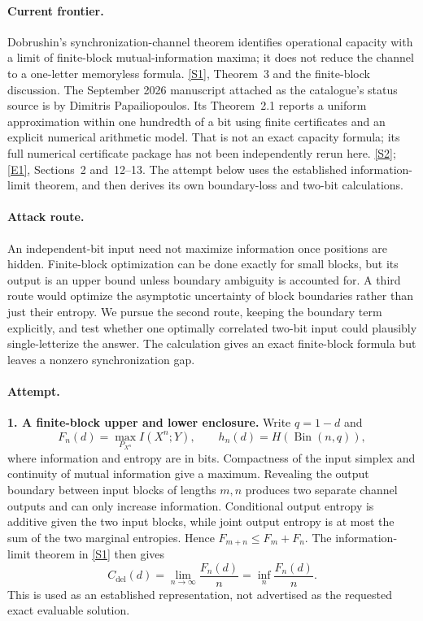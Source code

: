 \documentclass[11pt,a4paper]{article}
\newcommand{\sref}[2]{\hyperlink{source:#1:#2}{[S#2]}}
\newcommand{\eref}[2]{\hyperlink{extra:#1:#2}{[E#2]}}
\numberwithin{equation}{section}
\begin{document}
\paragraph{Current frontier.}
Dobrushin's synchronization-channel theorem identifies operational
capacity with a limit of finite-block mutual-information maxima; it
does not reduce the channel to a one-letter memoryless formula.
\sref{30006798}{1}, Theorem~3 and the finite-block discussion.
The September 2026 manuscript attached as the catalogue's status source
is by Dimitris Papailiopoulos. Its Theorem~2.1 reports a uniform
approximation within one hundredth of a bit using finite certificates
and an explicit numerical arithmetic model. That is not an exact capacity
formula; its full numerical certificate package has not been independently
rerun here. \sref{30006798}{2}; \eref{30006798}{1}, Sections~2 and~12--13.
The attempt below uses the established information-limit theorem, and
then derives its own boundary-loss and two-bit calculations.

\paragraph{Attack route.}
An independent-bit input need not maximize information once positions
are hidden. Finite-block optimization can be done exactly for small
blocks, but its output is an upper bound unless boundary ambiguity is
accounted for. A third route would optimize the asymptotic uncertainty
of block boundaries rather than just their entropy. We pursue the
second route, keeping the boundary term explicitly, and test whether
one optimally correlated two-bit input could plausibly single-letterize
the answer. The calculation gives an exact finite-block formula but
leaves a nonzero synchronization gap.

\paragraph{Attempt.}
\textbf{1. A finite-block upper and lower enclosure.}
Write $q=1-d$ and
\[
 F_n(d)=\max_{P_{X^n}}I(X^n;Y),\qquad
 h_n(d)=H(\operatorname{Bin}(n,q)),
\]
where information and entropy are in bits. Compactness of the input
simplex and continuity of mutual information give a maximum. Revealing
the output boundary between input blocks of lengths $m,n$ produces two
separate channel outputs and can only increase information. Conditional
output entropy is additive given the two input blocks, while joint
output entropy is at most the sum of the two marginal entropies. Hence
$F_{m+n}\le F_m+F_n$. The information-limit theorem in \sref{30006798}{1}
then gives
\[
 C_{\mathrm{del}}(d)=\lim_{n\to\infty}\frac{F_n(d)}n
                  =\inf_n\frac{F_n(d)}n.
\]
This is used as an established representation, not advertised as the
requested exact evaluable solution.
\end{document}
